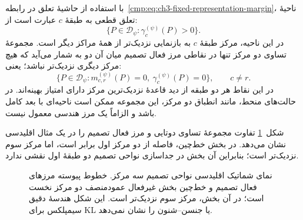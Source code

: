 با استفاده از حاشیهٔ تعلق در
رابطه~\eqref{cmp:eq:ch3-fixed-representation-margin}،
ناحیهٔ تعلق قطعی به طبقهٔ $c$ عبارت است از:
\begin{equation}\label{cmp:eq:ch3-strict-decision-region}
\{P\in\mathcal D_\psi:\gamma_c^{(\psi)}(P)>0\}.
\end{equation}
در این ناحیه، مرکز طبقهٔ $c$ به بازنمایی
نزدیک‌تر از همهٔ مراکز دیگر است. مجموعهٔ
تساوی دو مرکز تنها در نقاطی مرز فعال تصمیم
میان آن دو به شمار می‌آید که هیچ مرکز دیگری
نزدیک‌تر نباشد؛ یعنی:
\begin{equation}\label{cmp:eq:ch3-active-decision-tie}
\{P\in\mathcal D_\psi:
m_{c,r}^{(\psi)}(P)=0,\ 
\gamma_c^{(\psi)}(P)=0\},
\qquad c\ne r.
\end{equation}
در این نقاط هر دو طبقه از دید قاعدهٔ
نزدیک‌ترین مرکز دارای امتیاز بهینه‌اند.
در حالت‌های منحط، مانند انطباق دو مرکز،
این مجموعه ممکن است ناحیه‌ای با بعد کامل
باشد و الزاماً یک مرز هندسی معمول نیست.

شکل~\ref{cmp:fig:ch3-active-decision-boundaries}
تفاوت مجموعهٔ تساوی دوتایی و مرز فعال
تصمیم را در یک مثال اقلیدسی نشان می‌دهد.
در بخش خط‌چین، فاصله از دو مرکز اول برابر
است، اما مرکز سوم نزدیک‌تر است؛ بنابراین
آن بخش در جداسازی نواحی تصمیم دو طبقهٔ
اول نقشی ندارد.

\begin{figure}[!htbp]
\centering
\begin{LTR}
\centering
{}
\end{LTR}
\caption{نمای شماتیک اقلیدسی نواحی تصمیم سه مرکز.
خطوط پیوسته مرزهای فعال تصمیم و خط‌چین بخش غیرفعال
عمودمنصف دو مرکز نخست است؛ در آن بخش، مرکز سوم
نزدیک‌تر است. این شکل هندسهٔ دقیق سیمپلکس برای KL
یا جنسن--شنون را نشان نمی‌دهد.}
\label{cmp:fig:ch3-active-decision-boundaries}
\end{figure}

